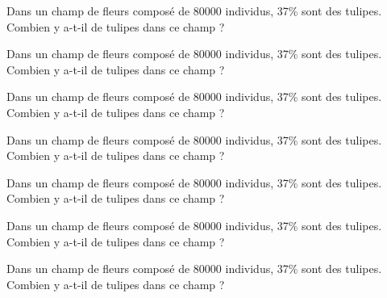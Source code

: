 \documentclass{exos}
\begin{document}
\begin{exercize*}
Dans un champ de fleurs composé de \num{80000} individus, \num{37}\% sont des tulipes. Combien y a-t-il de tulipes dans ce champ ?
\end{exercize*}
\vspace*{2cm}
\begin{exercize*}
Dans un champ de fleurs composé de \num{80000} individus, \num{37}\% sont des tulipes. Combien y a-t-il de tulipes dans ce champ ?
\end{exercize*}
\vspace*{2cm}
\begin{exercize*}
Dans un champ de fleurs composé de \num{80000} individus, \num{37}\% sont des tulipes. Combien y a-t-il de tulipes dans ce champ ?
\end{exercize*}
\vspace*{2cm}
\begin{exercize*}
Dans un champ de fleurs composé de \num{80000} individus, \num{37}\% sont des tulipes. Combien y a-t-il de tulipes dans ce champ ?
\end{exercize*}
\vspace*{2cm}
\begin{exercize*}
Dans un champ de fleurs composé de \num{80000} individus, \num{37}\% sont des tulipes. Combien y a-t-il de tulipes dans ce champ ?
\end{exercize*}
\vspace*{2cm}
\begin{exercize*}
Dans un champ de fleurs composé de \num{80000} individus, \num{37}\% sont des tulipes. Combien y a-t-il de tulipes dans ce champ ?
\end{exercize*}
\vspace*{2cm}
\begin{exercize*}
Dans un champ de fleurs composé de \num{80000} individus, \num{37}\% sont des tulipes. Combien y a-t-il de tulipes dans ce champ ?
\end{exercize*}
\vspace*{2cm}
\end{document}
